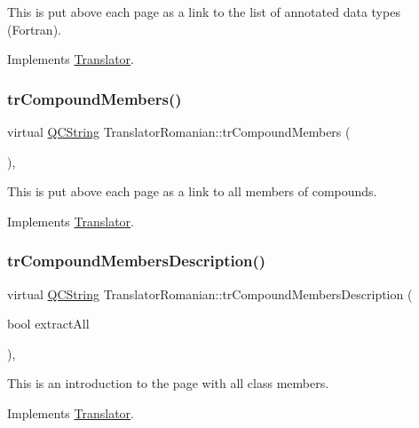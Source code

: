 This is put above each page as a link to the list of annotated data types (Fortran). 

Implements \mbox{\hyperlink{class_translator}{Translator}}.

\mbox{\label{class_translator_romanian_a5dff461eb8ef73e21543879e9392ed87}} 
\subsubsection{\texorpdfstring{trCompoundMembers()}{trCompoundMembers()}}
{\footnotesize\ttfamily virtual \mbox{\hyperlink{class_q_c_string}{Q\+C\+String}} Translator\+Romanian\+::tr\+Compound\+Members (\begin{DoxyParamCaption}{ }\end{DoxyParamCaption})\hspace{0.3cm}{\ttfamily [inline]}, {\ttfamily [virtual]}}

This is put above each page as a link to all members of compounds. 

Implements \mbox{\hyperlink{class_translator}{Translator}}.

\mbox{\label{class_translator_romanian_ab576e1d0c5571fc35bf7913c1fe65c86}} 
\subsubsection{\texorpdfstring{trCompoundMembersDescription()}{trCompoundMembersDescription()}}
{\footnotesize\ttfamily virtual \mbox{\hyperlink{class_q_c_string}{Q\+C\+String}} Translator\+Romanian\+::tr\+Compound\+Members\+Description (\begin{DoxyParamCaption}\item[{bool}]{extract\+All }\end{DoxyParamCaption})\hspace{0.3cm}{\ttfamily [inline]}, {\ttfamily [virtual]}}

This is an introduction to the page with all class members. 

Implements \mbox{\hyperlink{class_translator}{Translator}}.

